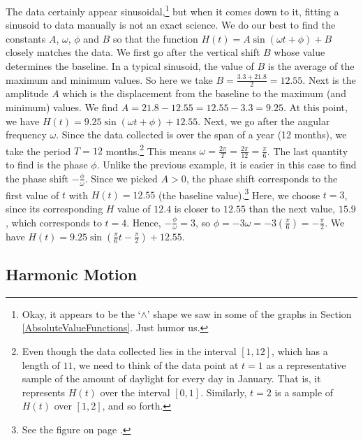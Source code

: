 \begin{ex}
\begin{enumerate}
The data certainly appear sinusoidal,\footnote{Okay, it appears to be the `$\wedge$' shape we saw in some of the graphs in Section \ref{AbsoluteValueFunctions}.  Just humor us.} but when it comes down to it, fitting a sinusoid to data manually is not an exact science.  We do our best to find the constants $A$, $\omega$, $\phi$ and $B$ so that the function $H(t) = A\sin(\omega t + \phi) + B$ closely matches the data.  We first go after the vertical shift $B$ whose value determines the baseline.  In a typical sinusoid, the value of $B$ is the average of the maximum and minimum values.  So here we take $B = \frac{3.3+21.8}{2} = 12.55$.  Next is the amplitude $A$ which is the displacement from the baseline to the maximum (and minimum) values.  We find $A = 21.8 - 12.55 = 12.55 - 3.3 = 9.25$.  At this point, we have $H(t) = 9.25\sin(\omega t + \phi) + 12.55$.  Next, we go after the angular frequency $\omega$.  Since the data collected is over the span of a year (12 months), we take the period $T = 12$ months.\footnote{Even though the data collected lies in the interval $[1,12]$, which has a length of $11$, we need to think of the data point at $t=1$ as a representative sample of the amount of daylight for every day in January. That is, it represents $H(t)$ over the interval $[0,1]$.  Similarly, $t=2$ is a sample of $H(t)$ over $[1,2]$, and so forth.}   This means $\omega = \frac{2\pi}{T} = \frac{2\pi}{12} = \frac{\pi}{6}$.  The last quantity to find is the phase $\phi$. Unlike the previous example,  it is easier in this case to find the phase shift $-\frac{\phi}{\omega}$.  Since we picked $A > 0$, the phase shift corresponds to the first value of $t$ with $H(t) = 12.55$ (the baseline value).\footnote{See the figure on page \pageref{genericsinsuoidfigure}.}  Here, we choose $t = 3$, since its corresponding $H$ value of $12.4$ is closer to  $12.55$ than the next value, $15.9$, which corresponds to $t=4$.  Hence, $-\frac{\phi}{\omega} = 3$, so $\phi = -3 \omega = -3 \left(\frac{\pi}{6}\right) = -\frac{\pi}{2}$.  We have $H(t) = 9.25 \sin\left(\frac{\pi}{6} t - \frac{\pi}{2}\right) + 12.55$.

\end{enumerate}

\end{ex}

\subsection{Harmonic Motion}
\label{harmomicmotion}


